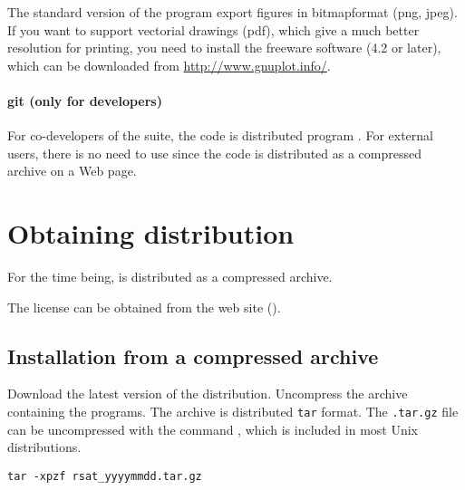 \documentclass[12pt,a4paper, oneside]{scrreprt} %
\begin{document}
The standard version of the \RSAT program  export
figures in bitmapformat (png, jpeg). If you want to support vectorial
drawings (pdf), which give a much better resolution for printing, you
need to install the freeware software  (4.2 or
later), which can be downloaded from \url{http://www.gnuplot.info/}.


\subsubsection{git (only for developers)}

For co-developers of the \RSAT suite, the code is distributed program
. For external users, there is no need to use
 since the code is distributed as a compressed archive on
a Web page.


\chapter{Obtaining \RSAT distribution}

For the time being, \RSAT is distributed as a compressed archive. 

The license can be obtained from the \RSAT web site (\rsaturl).

\section{Installation from a compressed archive}

Download the latest version of the \RSAT distribution. Uncompress the
archive containing the programs. The archive is distributed
\texttt{tar} format. The \texttt{.tar.gz} file can be uncompressed
with the command , which is included in most Unix
distributions.

\begin{lstlisting}
tar -xpzf rsat_yyyymmdd.tar.gz
\end{lstlisting}



\end{document}
